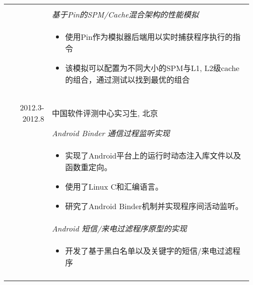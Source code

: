 \documentclass[a4paper,10pt]{article} %
\begin{document}
\begin{tabular}{r|p{11cm}}
\multicolumn{2}{c}{} \\
& \emph{基于Pin的SPM/Cache混合架构的性能模拟}\\
& \footnotesize{
\begin{itemize}
\item 使用Pin作为模拟器后端用以实时捕获程序执行的指令
\item 该模拟可以配置为不同大小的SPM与L1, L2级cache的组合，通过测试以找到最优的组合
\end{itemize}
}\\




\multicolumn{2}{c}{} \\

\multicolumn{2}{c}{} \\
\textsc{2012.3-2012.8} & \textsc{中国软件评测中心}实习生, 北京 \emph{}\smallskip\\
& \emph{Android Binder 通信过程监听实现}\\
& \footnotesize{
\begin{itemize}
\item 实现了Android平台上的运行时动态注入库文件以及函数重定向。
\item 使用了Linux C和汇编语言。
\item 研究了Android Binder机制并实现程序间活动监听。
\end{itemize}
}\\
& \emph{Android 短信/来电过滤程序原型的实现}\\
& \footnotesize{
  \begin{itemize}
  \item 开发了基于黑白名单以及关键字的短信/来电过滤程序
  \end{itemize}
}\\
\multicolumn{2}{c}{} \\
\end{tabular}
\end{document}
